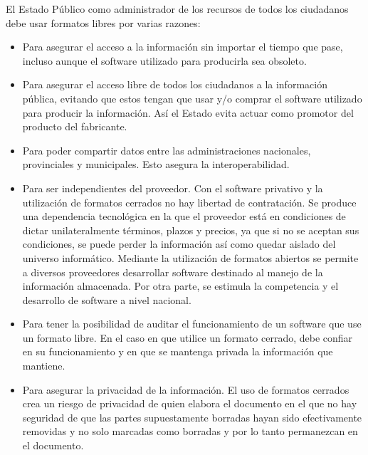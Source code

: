 \documentclass[12pt]{article}
\begin{document}
El Estado Público como administrador de los recursos de todos los ciudadanos debe usar formatos libres por varias razones:
\begin{itemize}
\item Para asegurar el acceso a la información sin importar el tiempo que pase, incluso aunque el software utilizado para producirla sea obsoleto.

\item Para asegurar el acceso libre de todos los ciudadanos a la información pública, evitando que estos tengan que usar y/o comprar el software utilizado para producir la información. Así el Estado evita actuar como promotor del producto del fabricante.

\item Para poder compartir datos entre las administraciones nacionales, provinciales y municipales. Esto asegura la interoperabilidad.

\item Para ser independientes del proveedor. Con el software privativo y la utilización de formatos cerrados no hay libertad de contratación. Se produce una dependencia tecnológica en la que el proveedor está en condiciones de dictar unilateralmente términos, plazos y precios, ya que si no se aceptan sus condiciones, se puede perder la información así como quedar aislado del universo informático. Mediante la utilización de formatos abiertos se permite a diversos proveedores desarrollar software destinado al manejo de la información almacenada. Por otra parte, se estimula la competencia y el desarrollo de software a nivel nacional.

\item Para tener la posibilidad de auditar el funcionamiento de un software que use un formato libre. En el caso en que utilice un formato cerrado, debe confiar en su funcionamiento y en que se mantenga privada la información que mantiene.

\item Para asegurar la privacidad de la información. El uso de formatos cerrados crea un riesgo de privacidad de quien elabora el documento en el que no hay seguridad de que las partes supuestamente borradas hayan sido efectivamente removidas y no solo marcadas como borradas y por lo tanto permanezcan en el documento. 
\end{itemize}
\end{document}
